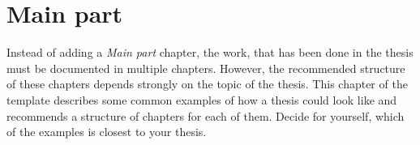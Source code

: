 \chapter{Main part}

Instead of adding a \textit{Main part} chapter, the work, that has been done in the thesis must be documented in multiple chapters.
However, the recommended structure of these chapters depends strongly on the topic of the thesis.
This chapter of the template describes some common examples of how a thesis could look like and recommends a structure of chapters for each of them.
Decide for yourself, which of the examples is closest to your thesis.




